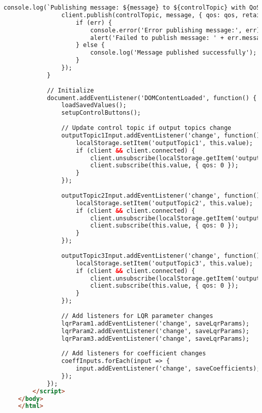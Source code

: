 \begin{lstlisting}[language=html]
                console.log(`Publishing message: ${message} to ${controlTopic} with QoS ${qos}`);
                client.publish(controlTopic, message, { qos: qos, retain: false }, function(err) {
                    if (err) {
                        console.error('Error publishing message:', err);
                        alert('Failed to publish message: ' + err.message);
                    } else {
                        console.log('Message published successfully');
                    }
                });
            }
    
            // Initialize
            document.addEventListener('DOMContentLoaded', function() {
                loadSavedValues();
                setupControlButtons();
                
                // Update control topic if output topics change
                outputTopic1Input.addEventListener('change', function() {
                    localStorage.setItem('outputTopic1', this.value);
                    if (client && client.connected) {
                        client.unsubscribe(localStorage.getItem('outputTopic1'));
                        client.subscribe(this.value, { qos: 0 });
                    }
                });
                
                outputTopic2Input.addEventListener('change', function() {
                    localStorage.setItem('outputTopic2', this.value);
                    if (client && client.connected) {
                        client.unsubscribe(localStorage.getItem('outputTopic2'));
                        client.subscribe(this.value, { qos: 0 });
                    }
                });
                
                outputTopic3Input.addEventListener('change', function() {
                    localStorage.setItem('outputTopic3', this.value);
                    if (client && client.connected) {
                        client.unsubscribe(localStorage.getItem('outputTopic3'));
                        client.subscribe(this.value, { qos: 0 });
                    }
                });
                
                // Add listeners for LQR parameter changes
                lqrParam1.addEventListener('change', saveLqrParams);
                lqrParam2.addEventListener('change', saveLqrParams);
                lqrParam3.addEventListener('change', saveLqrParams);
                
                // Add listeners for coefficient changes
                coeffInputs.forEach(input => {
                    input.addEventListener('change', saveCoefficients);
                });
            });
        </script>
    </body>
    </html>
\end{lstlisting}

\endinput
